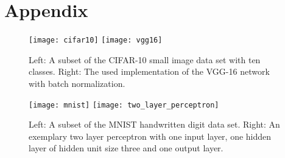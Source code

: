 \section{Appendix}
\begin{figure}[h!]
	\centering
	\texttt{[image: cifar10]}
	\texttt{[image: vgg16]}
	\caption{Left: A subset of the CIFAR-10 small image data set with ten classes. Right: The used implementation of the VGG-16 network with batch normalization.}	
	\label{fig:cifar-vgg}
\end{figure}

\begin{figure}[h!]
	\centering
	\texttt{[image: mnist]}
	\texttt{[image: two\_layer\_perceptron]}
	\caption{Left: A subset of the MNIST handwritten digit data set. Right: An exemplary two layer perceptron with one input layer, one hidden layer of hidden unit size three and one output layer.}	
	\label{fig:mnist-two-layer}
\end{figure}